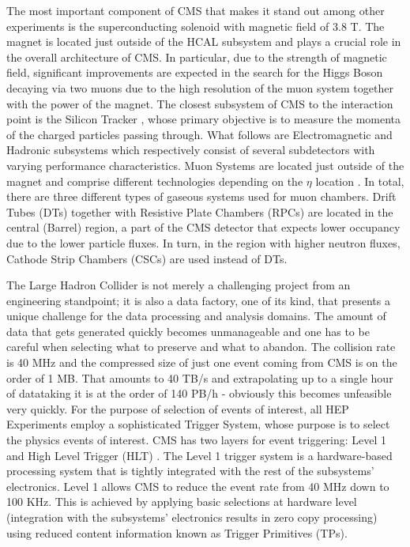 The most important component of CMS that makes it stand out among other experiments is the superconducting solenoid with magnetic field of 3.8 T. The magnet is located just outside of the HCAL subsystem and plays a crucial role in the overall architecture of CMS. In particular, due to the strength of magnetic field, significant improvements are expected in the search for the Higgs Boson decaying via two muons due to the high resolution of the muon system together with the power of the magnet. The closest subsystem of CMS to the interaction point is the Silicon Tracker \cite{Tracker}, whose primary objective is to measure the momenta of the charged particles passing through. What follows are Electromagnetic \cite{ECAL} and Hadronic \cite{HCAL} subsystems which respectively consist of several subdetectors with varying performance characteristics. Muon Systems are located just outside of the magnet and comprise different technologies depending on the $\eta$ location \cite{Muon}. In total, there are three different types of gaseous systems used for muon chambers. Drift Tubes (DTs) together with Resistive Plate Chambers (RPCs) are located in the central (Barrel) region, a part of the CMS detector that expects lower occupancy due to the lower particle fluxes. In turn, in the region with higher neutron fluxes, Cathode Strip Chambers (CSCs) are used instead of DTs.

The Large Hadron Collider is not merely a challenging project from an engineering standpoint; it is also a data factory, one of its kind, that presents a unique challenge for the data processing and analysis domains. The amount of data that gets generated quickly becomes unmanageable and one has to be careful when selecting what to preserve and what to abandon. The collision rate is 40 MHz and the compressed size of just one event coming from CMS is on the order of 1 MB. That amounts to 40 TB/s and extrapolating up to a single hour of datataking it is at the order of 140 PB/h - obviously this becomes unfeasible very quickly. For the purpose of selection of events of interest, all HEP Experiments employ a sophisticated Trigger System, whose purpose is to select the physics events of interest. CMS has two layers for event triggering: Level 1 \cite{L1Trigger} and High Level Trigger (HLT) \cite{HLTrigger}. The Level 1 trigger system is a hardware-based processing system that is tightly integrated with the rest of the subsystems' electronics. Level 1 allows CMS to reduce the event rate from 40 MHz down to 100 KHz. This is achieved by applying basic selections at hardware level (integration with the subsystems' electronics results in zero copy processing) using reduced content information known as Trigger Primitives (TPs).

